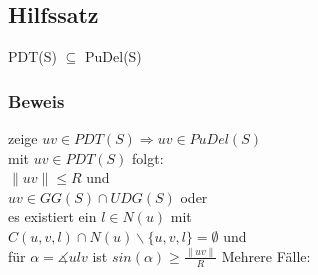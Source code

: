 \documentclass{article}
\newcommand{\doubleAbs}[1]{
	\|#1\|
}
\begin{document}
\subsection*{Hilfssatz}
PDT(S) $\subseteq$ PuDel(S) \\

\subsubsection*{Beweis}
zeige $uv \in PDT(S) \Rightarrow uv \in PuDel(S)$\\
mit $uv \in PDT(S)$ folgt: \\
$\doubleAbs{uv} \leq R$ und \\
$uv \in GG(S) \cap UDG(S)$ oder \\
es existiert ein $l \in N(u)$ mit \\
$C(u,v,l) \cap N(u) \backslash \{u,v,l\} = \emptyset$ und \\
für $\alpha = \measuredangle u l v$ ist $sin(\alpha) \geq \frac{\doubleAbs{uv}}{R}$
Mehrere Fälle:
\end{document}
